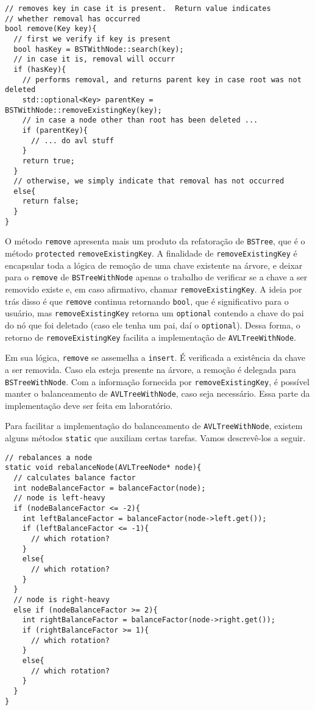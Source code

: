 \documentclass[11pt]{article}
\begin{document}
\begin{verbatim}
// removes key in case it is present.  Return value indicates
// whether removal has occurred
bool remove(Key key){
  // first we verify if key is present
  bool hasKey = BSTWithNode::search(key);
  // in case it is, removal will occurr
  if (hasKey){
    // performs removal, and returns parent key in case root was not deleted
    std::optional<Key> parentKey = BSTWithNode::removeExistingKey(key);
    // in case a node other than root has been deleted ...
    if (parentKey){
      // ... do avl stuff
    }
    return true;
  }
  // otherwise, we simply indicate that removal has not occurred
  else{
    return false;
  }
}
\end{verbatim}

O método \texttt{remove} apresenta mais um produto da refatoração de
\texttt{BSTree}, que é o método \texttt{protected} \texttt{removeExistingKey}.  A
finalidade de \texttt{removeExistingKey} é encapsular toda a lógica de
remoção de uma chave existente na árvore, e deixar para o \texttt{remove}
de \texttt{BSTreeWithNode} apenas o trabalho de verificar se a chave a
ser removido existe e, em caso afirmativo, chamar
\texttt{removeExistingKey}.  A ideia por trás disso é que \texttt{remove}
continua retornando \texttt{bool}, que é significativo para o usuário,
mas \texttt{removeExistingKey} retorna um \texttt{optional} contendo a chave do
pai do nó que foi deletado (caso ele tenha um pai, daí o
\texttt{optional}).  Dessa forma, o retorno de \texttt{removeExistingKey}
facilita a implementação de \texttt{AVLTreeWithNode}.

Em sua lógica, \texttt{remove} se assemelha a \texttt{insert}.  É verificada a
existência da chave a ser removida.  Caso ela esteja presente na
árvore, a remoção é delegada para \texttt{BSTreeWithNode}.  Com a
informação fornecida por \texttt{removeExistingKey}, é possível manter o
balanceamento de \texttt{AVLTreeWithNode}, caso seja necessário.  Essa
parte da implementação deve ser feita em laboratório.

Para facilitar a implementação do balanceamento de
\texttt{AVLTreeWithNode}, existem alguns métodos \texttt{static} que auxiliam
certas tarefas.  Vamos descrevê-los a seguir.

\begin{verbatim}
// rebalances a node
static void rebalanceNode(AVLTreeNode* node){
  // calculates balance factor
  int nodeBalanceFactor = balanceFactor(node);
  // node is left-heavy
  if (nodeBalanceFactor <= -2){
    int leftBalanceFactor = balanceFactor(node->left.get());
    if (leftBalanceFactor <= -1){
      // which rotation?
    }
    else{
      // which rotation?
    }
  }
  // node is right-heavy
  else if (nodeBalanceFactor >= 2){
    int rightBalanceFactor = balanceFactor(node->right.get());
    if (rightBalanceFactor >= 1){
      // which rotation?
    }
    else{
      // which rotation?
    }
  }
}
\end{verbatim}
\end{document}
